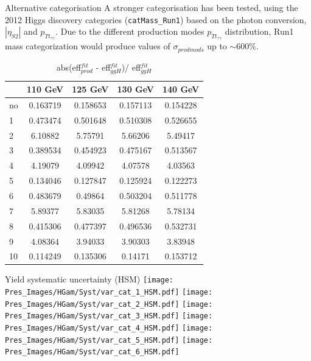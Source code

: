 \documentclass[10pt,UKenglish, leqno, xcolor = dvipsnames]{beamer}
\begin{document}
	\begin{frame}{Alternative categorisation}
		A stronger categorisation has been tested, using the 2012 Higgs discovery categories (\texttt{catMass\_Run1}) based on the photon conversion, $|\eta_{S2}|$ and $p_{Tt_{\gamma\gamma}}$. Due to the different production modes $p_{Tt_{\gamma\gamma}}$ distribution, Run1 mass categorization would produce values of $\sigma_{prod mods}$ up to $\sim$600\%.
		\begin{table}[tbp]
			\centering
			\small
			\begin{tabular}{lcccc}
				\toprule[1.5pt]
				& 110 GeV	& 125 GeV	& 130 GeV	& 140 GeV	\\
				\midrule
				no & 0.163719 & 0.158653 & 0.157113 & 0.154228	\\
				1 & 0.473474 & 0.501648 & 0.510308 & 0.526655	\\
				2 & 6.10882 & 5.75791 & 5.66206 & 5.49417		\\
				3 & 0.389534 & 0.454923 & 0.475167 & 0.513567	\\
				4 & 4.19079 & 4.09942 & 4.07578 & 4.03563		\\
				5 & 0.134046 & 0.127847 & 0.125924 & 0.122273	\\
				6 & 0.483679 & 0.49864 & 0.503204 & 0.511778	\\
				7 & 5.89377 & 5.83035 & 5.81268 & 5.78134		\\
				8 & 0.415306 & 0.477397 & 0.496536 & 0.532731	\\
				9 & 4.08364 & 3.94033 & 3.90303 & 3.83948		\\
				10 & 0.114249 & 0.135306 & 0.14171 & 0.153712	\\
				
				\bottomrule[1.5pt]
			\end{tabular}
			\caption{abs(eff$^{fit}_{prod}$ - eff$^{fit}_{ggH}$)/ eff$^{fit}_{ggH}$}
		\end{table}
	\end{frame}

	\begin{frame}{Yield systematic uncertainty (HSM)}
		\vfill
		\centering
		\texttt{[image: Pres\_Images/HGam/Syst/var\_cat\_1\_HSM.pdf]}
		\texttt{[image: Pres\_Images/HGam/Syst/var\_cat\_2\_HSM.pdf]}
		\texttt{[image: Pres\_Images/HGam/Syst/var\_cat\_3\_HSM.pdf]}
		\texttt{[image: Pres\_Images/HGam/Syst/var\_cat\_4\_HSM.pdf]}
		\texttt{[image: Pres\_Images/HGam/Syst/var\_cat\_5\_HSM.pdf]}
		\texttt{[image: Pres\_Images/HGam/Syst/var\_cat\_6\_HSM.pdf]}
		\vfill
	\end{frame}
	
\end{document}
